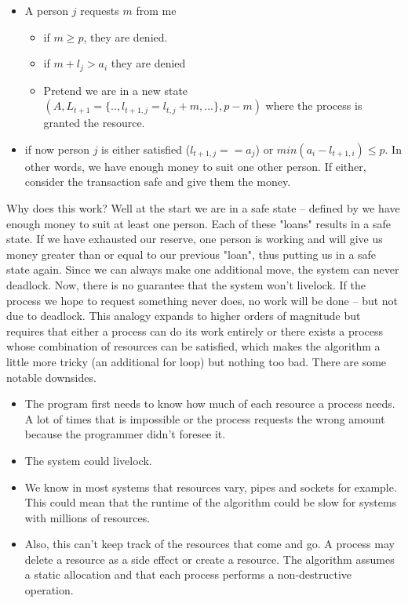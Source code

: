 \begin{itemize}
	\item A person $j$ requests $m$ from me
	      \begin{itemize}
	      	\item if $m \geq p$, they are denied.
	      	\item if $m + l_j > a_i$ they are denied
	      	\item Pretend we are in a new state $(A, L_{t+1}=\{.., l_{t+1, j} = l_{t, j} + m, ...\}, p - m)$ where the process is granted the resource.
	      \end{itemize}
	\item if now person $j$ is either satisfied ($l_{t+1,j} == a_j$) or $min(a_i - l_{t+1, i}) \leq p$. In other words, we have enough money to suit one other person. If either, consider the transaction safe and give them the money.
\end{itemize}

Why does this work? Well at the start we are in a safe state -- defined by we have enough money to suit at least one person.
Each of these "loans" results in a safe state.
If we have exhausted our reserve, one person is working and will give us money greater than or equal to our previous "loan", thus putting us in a safe state again.
Since we can always make one additional move, the system can never deadlock.
Now, there is no guarantee that the system won't livelock.
If the process we hope to request something never does, no work will be done -- but not due to deadlock.
This analogy expands to higher orders of magnitude but requires that either a process can do its work entirely or there exists a process whose combination of resources can be satisfied, which makes the algorithm a little more tricky (an additional for loop) but nothing too bad.
There are some notable downsides.

\begin{itemize}
	\item The program first needs to know how much of each resource a process needs. A lot of times that is impossible or the process requests the wrong amount because the programmer didn't foresee it.
	\item The system could livelock.
	\item We know in most systems that resources vary, pipes and sockets for example. This could mean that the runtime of the algorithm could be slow for systems with millions of resources.
	\item Also, this can't keep track of the resources that come and go. A process may delete a resource as a side effect or create a resource. The algorithm assumes a static allocation and that each process performs a non-destructive operation.
\end{itemize}

